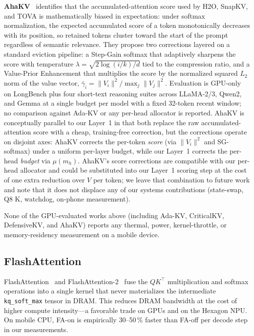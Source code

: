 \documentclass[sigconf, anonymous=false, screen=true]{acmart}
\begin{document}
\textbf{AhaKV}~\cite{gu2025ahakv} identifies that the accumulated-attention score used by H2O, SnapKV, and TOVA is mathematically biased in expectation: under softmax normalization, the expected accumulated score of a token monotonically decreases with its position, so retained tokens cluster toward the start of the prompt regardless of semantic relevance. They propose two corrections layered on a standard eviction pipeline: a Step-Gain softmax that adaptively sharpens the score with temperature $\lambda = \sqrt{2\log(i/k)/d}$ tied to the compression ratio, and a Value-Prior Enhancement that multiplies the score by the normalized squared $L_2$ norm of the value vector, $\bar\gamma_i = \|V_i\|^2 / \max_j \|V_j\|^2$. Evaluation is GPU-only on LongBench plus four short-text reasoning suites across LLaMA-2/3, Qwen2, and Gemma at a single budget per model with a fixed 32-token recent window; no comparison against Ada-KV or any per-head allocator is reported. AhaKV is conceptually parallel to our Layer~1 in that both replace the raw accumulated-attention score with a cheap, training-free correction, but the corrections operate on disjoint axes: AhaKV corrects the per-token \emph{score} (via $\|V_i\|^2$ and SG-softmax) under a uniform per-layer budget, while our Layer~1 corrects the per-head \emph{budget} via $\mu(m_h)$. AhaKV's score corrections are compatible with our per-head allocator and could be substituted into our Layer~1 scoring step at the cost of one extra reduction over $V$ per token; we leave that combination to future work and note that it does not displace any of our systems contributions (state-swap, Q8 K, watchdog, on-phone measurement).

None of the GPU-evaluated works above (including Ada-KV, CriticalKV, DefensiveKV, and AhaKV) reports any thermal, power, kernel-throttle, or memory-residency measurement on a mobile device.

\subsection{FlashAttention}

FlashAttention~\cite{dao2022flashattention} and FlashAttention-2~\cite{dao2023flashattention2} fuse the $Q K^\top$ multiplication and softmax operations into a single kernel that never materializes the intermediate \texttt{kq\_soft\_max} tensor in DRAM. This reduces DRAM bandwidth at the cost of higher compute intensity---a favorable trade on GPUs and on the Hexagon NPU. On mobile CPU, FA-on is empirically 30--50\,\% faster than FA-off per decode step in our measurements.
\end{document}
